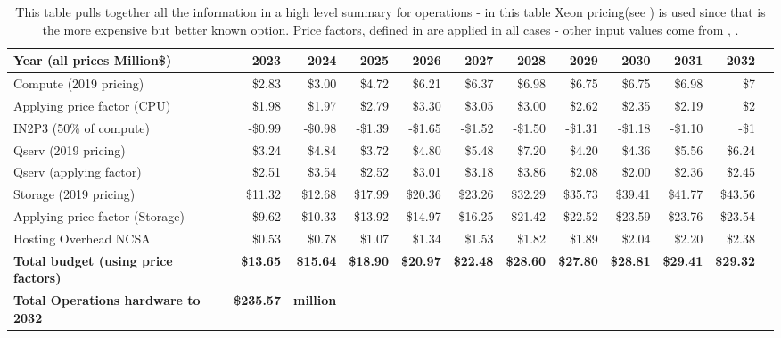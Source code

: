 \tiny \begin{longtable} { |p{}  |r  |r  |r  |r  |r  |r  |r  |r  |r  |r  |r |} 
\caption{This table pulls together all the information in a high level summary for operations - in this table Xeon pricing(see ) is used since that is the more expensive but better known option. Price factors, defined in  are applied in all cases - other input values come from , .
 \label{tab:opsSummary}}\\ 
\hline 
\textbf{Year  (all prices Million\$)}&\textbf{2023}&\textbf{2024}&\textbf{2025}&\textbf{2026}&\textbf{2027}&\textbf{2028}&\textbf{2029}&\textbf{2030}&\textbf{2031}&\textbf{2032} \\ \hline
{Compute (2019 pricing)}&{\$2.83}&{\$3.00}&{\$4.72}&{\$6.21}&{\$6.37}&{\$6.98}&{\$6.75}&{\$6.75}&{\$6.98}&{\$7} \\ \hline
{Applying price factor (CPU)}&{\$1.98}&{\$1.97}&{\$2.79}&{\$3.30}&{\$3.05}&{\$3.00}&{\$2.62}&{\$2.35}&{\$2.19}&{\$2} \\ \hline
{IN2P3 (50\% of compute)}&{-\$0.99}&{-\$0.98}&{-\$1.39}&{-\$1.65}&{-\$1.52}&{-\$1.50}&{-\$1.31}&{-\$1.18}&{-\$1.10}&{-\$1} \\ \hline
{Qserv (2019 pricing)}&{\$3.24}&{\$4.84}&{\$3.72}&{\$4.80}&{\$5.48}&{\$7.20}&{\$4.20}&{\$4.36}&{\$5.56}&{\$6.24} \\ \hline
{Qserv (applying factor)}&{\$2.51}&{\$3.54}&{\$2.52}&{\$3.01}&{\$3.18}&{\$3.86}&{\$2.08}&{\$2.00}&{\$2.36}&{\$2.45} \\ \hline
{Storage (2019 pricing)}&{\$11.32}&{\$12.68}&{\$17.99}&{\$20.36}&{\$23.26}&{\$32.29}&{\$35.73}&{\$39.41}&{\$41.77}&{\$43.56} \\ \hline
{Applying price factor (Storage)}&{\$9.62}&{\$10.33}&{\$13.92}&{\$14.97}&{\$16.25}&{\$21.42}&{\$22.52}&{\$23.59}&{\$23.76}&{\$23.54} \\ \hline
{Hosting Overhead NCSA
}&{\$0.53}&{\$0.78}&{\$1.07}&{\$1.34}&{\$1.53}&{\$1.82}&{\$1.89}&{\$2.04}&{\$2.20}&{\$2.38} \\ \hline
\textbf{Total budget (using price factors)}&\textbf{\$13.65}&\textbf{\$15.64}&\textbf{\$18.90}&\textbf{\$20.97}&\textbf{\$22.48}&\textbf{\$28.60}&\textbf{\$27.80}&\textbf{\$28.81}&\textbf{\$29.41}&\textbf{\$29.32} \\ \hline
\textbf{Total Operations hardware to 2032 }&\textbf{\$235.57}&\textbf{million}&&&&&&&& \\ \hline
\end{longtable} \normalsize
